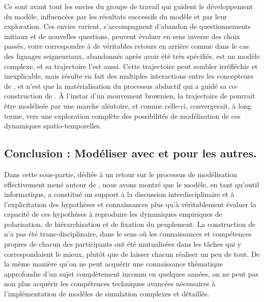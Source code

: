 Ce sont avant tout les envies du groupe de travail qui guident le développement du modèle, influencées par les résultats successifs du modèle et par leur exploration.
Ces envies varient, s'accompagnent d'abandon de questionnements initiaux et de nouvelles questions, peuvent évoluer en sens inverse des choix passés, voire correspondre à de véritables \og retours en arrière\fg{} comme dans le cas des lignages seigneuriaux, abandonnés après avoir été très spécifiés.
\simfeodal{} est un modèle complexe, et sa trajectoire l'est aussi.
Cette trajectoire peut sembler irréfléchie et inexplicable, mais résulte en fait des multiples interactions entre les concepteurs de \simfeodal{}, et n'est que la matérialisation du processus abductif qui a guidé sa co-construction de \simfeodal{}.
À l'instar d'un mouvement brownien, la trajectoire de \simfeodal{} pourrait être modélisée par une marche aléatoire, et comme celle-ci, convergerait, à long terme, vers une exploration complète des possibilités de modélisation de ces dynamiques spatio-temporelles.

\subsection{Conclusion : Modéliser avec et pour les autres.}

Dans cette sous-partie, dédiée à un retour sur le processus de modélisation effectivement mené autour de \simfeodal{}, nous avons montré que le modèle, en tant qu'outil informatique, a constitué un support à la discussion interdisciplinaire et à l'explicitation des hypothèses et connaissances plus qu'à véritablement évaluer la capacité de ces hypothèses à reproduire les dynamiques empiriques de polarisation, de hiérarchisation et de fixation du peuplement.
La construction de \simfeodal{} n'a pas été trans-disciplinaire, dans le sens où les connaissances et compétences propres de chacun des participants ont été mutualisées dans les tâches qui y correspondaient le mieux, plutôt que de laisser chacun réaliser \og un peu de tout\fg{}.
De la même manière qu'on ne peut acquérir une connaissance thématique approfondie d'un sujet complètement inconnu en quelques années, on ne peut pas non plus acquérir les compétences techniques avancées nécessaires à l'implémentation de modèles de simulation complexes et détaillés.

